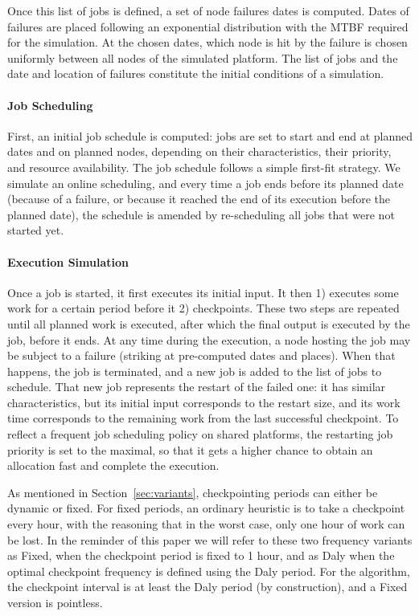 Once this list of jobs is defined, a set of node failures dates is
computed. Dates of failures are placed following an exponential
distribution with the MTBF required for the simulation. At the chosen
dates, which node is hit by the failure is chosen uniformly between
all nodes of the simulated platform. The list of jobs and the date and
location of failures constitute the initial conditions of a
simulation.

\paragraph*{Job Scheduling}
First, an initial job schedule is computed: jobs are set to start and
end at planned dates and on planned nodes, depending on their
characteristics, their priority, and resource availability. The job
schedule follows a simple first-fit strategy. We simulate an online
scheduling, and every time a job ends before its planned date
(because of a failure, or because it reached the end of its execution
before the planned date), the schedule is amended by re-scheduling all
jobs that were not started yet.

\paragraph*{Execution Simulation}
Once a job is started, it first executes its initial input. It then 1)
executes some work for a certain period before it 2) checkpoints. These two
steps are repeated until all planned work is executed, after which the
final output is executed by the job, before it ends. At any time
during the execution, a node hosting the job may be subject to a
failure (striking at pre-computed dates and places). When that
happens, the job is terminated, and a new job is added to the list of
jobs to schedule. That new job represents the restart of the failed
one: it has similar characteristics, but its initial input
corresponds to the restart size, and its work time corresponds to
the remaining work from the last successful checkpoint. To reflect a
frequent job scheduling policy on shared platforms, the restarting job
priority is set to the maximal, so that it gets a higher chance to
obtain an allocation fast and complete the execution.

As mentioned in Section~\ref{sec:variants}, checkpointing periods can
either be dynamic or fixed. For fixed periods, an ordinary heuristic
is to take a checkpoint every hour, with the reasoning that in the
worst case, only one hour of work can be lost. In the reminder of
this paper we will refer to these two frequency variants as Fixed,
when the checkpoint period is fixed to 1 hour, and as Daly when the
optimal checkpoint frequency is defined using the Daly period. For the
\leastwaste algorithm, the checkpoint interval is at least the Daly period
(by construction), and a Fixed version is pointless.

